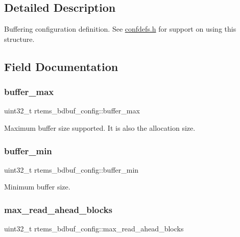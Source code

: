\subsection{Detailed Description}
Buffering configuration definition. See \mbox{\hyperlink{confdefs_8h}{confdefs.\+h}} for support on using this structure. 

\subsection{Field Documentation}
\mbox{\label{structrtems__bdbuf__config_acba6b2e2d78ab3ef64f2b7bc7b6eb95e}} 
\subsubsection{\texorpdfstring{buffer\_max}{buffer\_max}}
{\footnotesize\ttfamily uint32\+\_\+t rtems\+\_\+bdbuf\+\_\+config\+::buffer\+\_\+max}

Maximum buffer size supported. It is also the allocation size. \mbox{\label{structrtems__bdbuf__config_a5930452ff776ebc7153d0bb261bd3b36}} 
\subsubsection{\texorpdfstring{buffer\_min}{buffer\_min}}
{\footnotesize\ttfamily uint32\+\_\+t rtems\+\_\+bdbuf\+\_\+config\+::buffer\+\_\+min}

Minimum buffer size. \mbox{\label{structrtems__bdbuf__config_af001265475964e0b642aaed499fa9112}} 
\subsubsection{\texorpdfstring{max\_read\_ahead\_blocks}{max\_read\_ahead\_blocks}}
{\footnotesize\ttfamily uint32\+\_\+t rtems\+\_\+bdbuf\+\_\+config\+::max\+\_\+read\+\_\+ahead\+\_\+blocks}

